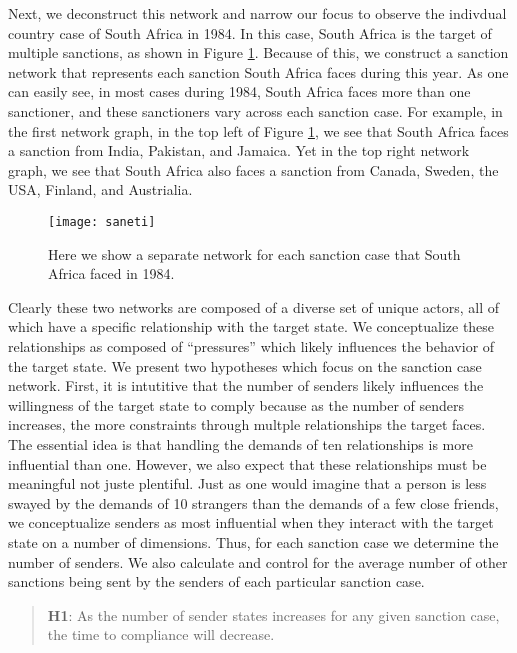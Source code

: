 Next, we deconstruct this network and narrow our focus to observe the indivdual country case of South Africa in 1984. In this case, South Africa is the target of multiple sanctions, as shown in Figure \ref{fig:saneti}. Because of this, we construct a sanction network that represents each sanction South Africa faces during this year. As one can easily see, in most cases during 1984, South Africa faces more than one sanctioner, and these sanctioners vary across each sanction case. For example, in the first network graph, in the top left of Figure \ref{fig:saneti}, we see that South Africa faces a sanction from India, Pakistan, and Jamaica. Yet in the top right network graph, we see that South Africa also faces a sanction from Canada, Sweden, the USA, Finland, and Austrialia. 

\begin{figure}[ht]
	\centering
	\texttt{[image: saneti]}
	\caption{Here we show a separate network for each sanction case that South Africa faced in 1984.}
	\label{fig:saneti}
\end{figure}
\FloatBarrier

Clearly these two networks are composed of a diverse set of unique actors, all of which have a specific relationship with the target state. We conceptualize these relationships as composed of ``pressures'' which likely influences the behavior of the target state. We present two hypotheses which focus on the sanction case network. First, it is intutitive that the number of senders likely influences the willingness of the target state to comply because as the number of senders increases, the more constraints through multple relationships the target faces. The essential idea is that handling the demands of ten relationships is more influential than one. However, we also expect that these relationships must be meaningful not juste plentiful. Just as one would imagine that a person is less swayed by the demands of 10 strangers than the demands of a few close friends, we conceptualize senders as most influential when they interact with the target state on a number of dimensions.  Thus, for each sanction case we determine the number of senders. We also calculate and control for the average number of other sanctions being sent by the senders of each particular sanction case.

\begin{quote}
	\textbf{H1}: As the number of sender states increases for any given sanction case, the time to compliance will decrease. 
\end{quote}

